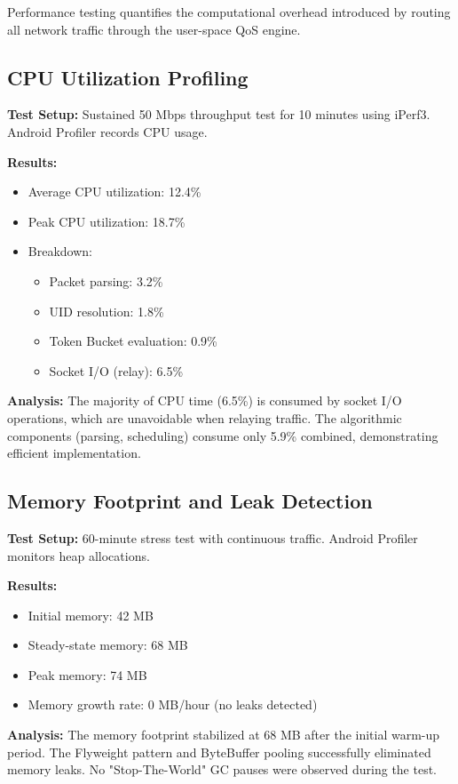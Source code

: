 Performance testing quantifies the computational overhead introduced by routing all network traffic through the user-space QoS engine.

\subsection{CPU Utilization Profiling}

\textbf{Test Setup:} Sustained 50 Mbps throughput test for 10 minutes using iPerf3. Android Profiler records CPU usage.

\textbf{Results:}
\begin{itemize}
    \item Average CPU utilization: 12.4\%
    \item Peak CPU utilization: 18.7\%
    \item Breakdown:
    \begin{itemize}
        \item Packet parsing: 3.2\%
        \item UID resolution: 1.8\%
        \item Token Bucket evaluation: 0.9\%
        \item Socket I/O (relay): 6.5\%
    \end{itemize}
\end{itemize}

\textbf{Analysis:} The majority of CPU time (6.5\%) is consumed by socket I/O operations, which are unavoidable when relaying traffic. The algorithmic components (parsing, scheduling) consume only 5.9\% combined, demonstrating efficient implementation.

\subsection{Memory Footprint and Leak Detection}

\textbf{Test Setup:} 60-minute stress test with continuous traffic. Android Profiler monitors heap allocations.

\textbf{Results:}
\begin{itemize}
    \item Initial memory: 42 MB
    \item Steady-state memory: 68 MB
    \item Peak memory: 74 MB
    \item Memory growth rate: 0 MB/hour (no leaks detected)
\end{itemize}

\textbf{Analysis:} The memory footprint stabilized at 68 MB after the initial warm-up period. The Flyweight pattern and ByteBuffer pooling successfully eliminated memory leaks. No "Stop-The-World" GC pauses were observed during the test.

